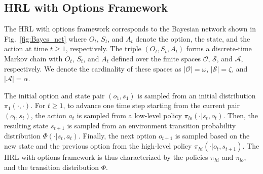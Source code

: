 \subsection{HRL with Options Framework}
The HRL with options framework corresponds to the Bayesian network shown in Fig.~\ref{fig:Bayes_net} where $O_t$, $S_t$, and $A_t$ denote the option, the state, and the action at time $t \geq 1$, respectively.
The triple $(O_t,S_t,A_t)$ forms a discrete-time Markov chain with $O_t$, $S_t$, and $A_t$ defined over the finite spaces $\mathcal{O}$, $\mathcal{S}$, and $\mathcal{A}$, respectively.
We denote the cardinality of these spaces as 
$\vert\mathcal{O}\vert=\omega$, $\vert\mathcal{S}\vert=\zeta$, and $\vert\mathcal{A}\vert=\alpha$.

The initial option and state pair $(o_1, s_1)$ is sampled from an initial distribution $\pi_1( \cdot, \cdot )$.
For $t \geq 1$, to advance one time step starting from the current pair $(o_t, s_t)$, the action $a_t$ is sampled from a low-level policy $\pi_{lo}(\cdot\vert s_t,o_t)$.
Then, the resulting state $s_{t+1}$ is sampled from an environment transition probability distribution $\Phi(\cdot\vert s_t,a_t)$.
Finally, the next option $o_{t+1}$ is sampled based on the new state and the previous option from the high-level policy $\pi_{hi}(\cdot\vert o_t,s_{t+1})$.
The HRL with options framework is thus characterized by the policies $\pi_{hi}$ and $\pi_{lo}$, and the transition distribution $\Phi$.

